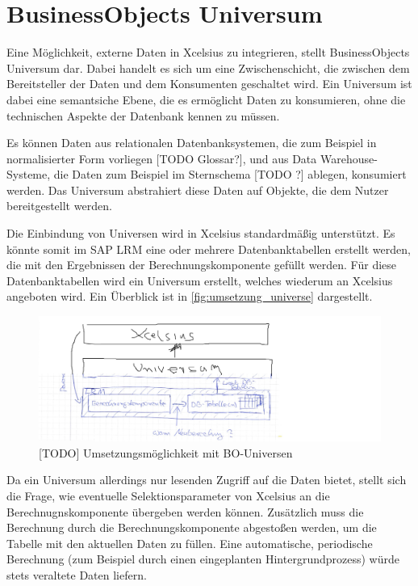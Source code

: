\section{BusinessObjects Universum}
Eine Möglichkeit, externe Daten in Xcelsius zu integrieren, stellt BusinessObjects Universum dar. Dabei handelt es sich um eine Zwischenschicht, die zwischen dem Bereitsteller der Daten und dem Konsumenten geschaltet wird. Ein Universum ist dabei eine semantsiche Ebene, die es ermöglicht Daten zu konsumieren, ohne die technischen Aspekte der Datenbank kennen zu müssen.

Es können Daten aus relationalen Datenbanksystemen, die zum Beispiel in normalisierter Form vorliegen [TODO Glossar?], und aus Data Warehouse-Systeme, die Daten zum Beispiel im Sternschema [TODO ?] ablegen, konsumiert werden. Das Universum abstrahiert diese Daten auf Objekte, die dem Nutzer bereitgestellt werden.


Die Einbindung von Universen wird in Xcelsius standardmäßig unterstützt. Es könnte somit im SAP LRM eine oder mehrere Datenbanktabellen erstellt werden, die mit den Ergebnissen der Berechnungskomponente gefüllt werden. Für diese Datenbanktabellen wird ein Universum erstellt, welches wiederum an Xcelsius angeboten wird. Ein Überblick ist in \vref{fig:umsetzung_universe} dargestellt.

\begin{figure}[h]
\centering
\setlength{\unitlength}{1mm}
\includegraphics[width=15cm]{images/umsetzung_universe.jpg}
\caption{[TODO] Umsetzungsmöglichkeit mit BO-Universen\label{fig:umsetzung_universe}}
\end{figure}

Da ein Universum allerdings nur lesenden Zugriff auf die Daten bietet, stellt sich die Frage, wie eventuelle Selektionsparameter von Xcelsius an die Berechnugnskomponente übergeben werden können. Zusätzlich muss die Berechnung durch die Berechnungskomponente abgestoßen werden, um die Tabelle mit den aktuellen Daten zu füllen. Eine automatische, periodische Berechnung (zum Beispiel durch einen eingeplanten Hintergrundprozess) würde stets veraltete Daten liefern.

